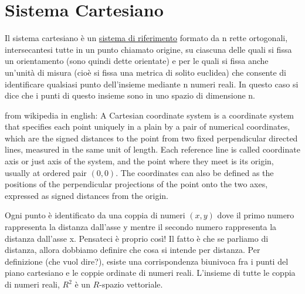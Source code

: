 \section{Sistema Cartesiano}
\begin{definizione}
Il sistema cartesiano \`{e} un \href{SistemaRiferimento.html}{sistema di riferimento} formato da n rette ortogonali, intersecantesi tutte in un punto
chiamato origine, su ciascuna delle quali si fissa un orientamento (sono quindi dette orientate) e per le quali si fissa
anche un'unità di misura (cio\`e si fissa una metrica di solito euclidea) che consente di identificare qualsiasi punto dell'insieme
mediante n numeri reali. In questo caso si dice che i punti di questo insieme sono in uno spazio di dimensione n.
\end{definizione}

\begin{definizione}
from wikipedia in english:
A Cartesian coordinate system is a coordinate system that specifies each point uniquely in a plain by a pair of numerical coordinates,
which are the signed distances to the point from two fixed perpendicular directed lines, measured in the same unit of length. 
Each reference line is called coordinate axis or just axis of the system, and the point where they meet is its origin, usually at
ordered pair $(0, 0)$. The coordinates can also be defined as the positions of the perpendicular projections of the point onto the
two axes, expressed as signed distances from the origin.
\end{definizione}

\begin{osservazione}
Ogni punto \`e identificato da una coppia di numeri $(x,y)$ dove il primo numero rappresenta la distanza dall'asse y mentre il secondo
numero rappresenta la distanza dall'asse x. Pensateci \`e proprio così! Il fatto \`e che se parliamo di distanza, allora dobbiamo definire
che cosa si intende per distanza. 
Per definizione (che vuol dire?), esiste una corrispondenza biunivoca fra i punti del piano cartesiano e le coppie ordinate di
numeri reali. L'insieme di tutte le coppia di numeri reali, $R^2$ \`e un $R$-spazio vettoriale.
\end{osservazione}
